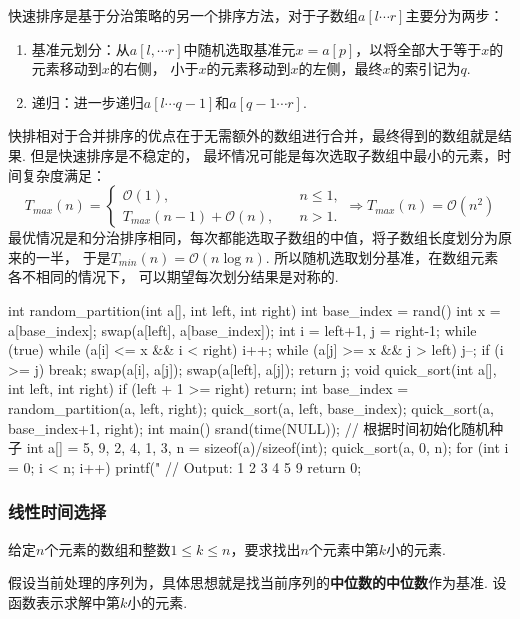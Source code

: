 \documentclass[12pt, a4paper, oneside]{ctexart}
\numberwithin{equation}{section}  %
\theoremstyle{definition}
\let\leq=\leqslant %
\def\O{\mathcal{O}}         %
\begin{document}
快速排序是基于分治策略的另一个排序方法，对于子数组$a[l\cdots r]$主要分为两步：
\begin{enumerate}
    \item 基准元划分：从$a[l,\cdots r]$中随机选取基准元$x=a[p]$，以将全部大于等于$x$的元素移动到$x$的右侧，
    小于$x$的元素移动到$x$的左侧，最终$x$的索引记为$q$.
    \item 递归：进一步递归$a[l\cdots q-1]$和$a[q-1\cdots r]$.
\end{enumerate}
快排相对于合并排序的优点在于无需额外的数组进行合并，最终得到的数组就是结果. 但是快速排序是不稳定的，
最坏情况可能是每次选取子数组中最小的元素，时间复杂度满足：
\begin{equation*}
    T_{max}(n) = \begin{cases}
        \O(1),&\quad n \leq 1,\\
        T_{max}(n-1)+\O(n),&\quad n > 1.
    \end{cases}\Rightarrow T_{max}(n) = \O(n^2)
\end{equation*}
最优情况是和分治排序相同，每次都能选取子数组的中值，将子数组长度划分为原来的一半，
于是$T_{min}(n) = \O(n\log n)$. 所以随机选取划分基准，在数组元素各不相同的情况下，
可以期望每次划分结果是对称的.
\begin{cppcode}
int random_partition(int a[], int left, int right) {
    int base_index = rand() %
    int x = a[base_index];
    swap(a[left], a[base_index]);
    int i = left+1, j = right-1;
    while (true) {
        while (a[i] <= x && i < right) i++;
        while (a[j] >= x && j > left) j--;
        if (i >= j) break;
        swap(a[i], a[j]);
    }
    swap(a[left], a[j]);
    return j;
}
void quick_sort(int a[], int left, int right) {
    if (left + 1 >= right) return;
    int base_index = random_partition(a, left, right);
    quick_sort(a, left, base_index);
    quick_sort(a, base_index+1, right);
}
int main() {
    srand(time(NULL));  // 根据时间初始化随机种子
    int a[] = {5, 9, 2, 4, 1, 3}, n = sizeof(a)/sizeof(int);
    quick_sort(a, 0, n);
    for (int i = 0; i < n; i++) printf("%
    // Output: 1 2 3 4 5 9
    return 0;
}
\end{cppcode}
\subsubsection{线性时间选择}
给定$n$个元素的数组和整数$1\leq k\leq n$，要求找出$n$个元素中第$k$小的元素.

假设当前处理的序列为，具体思想就是找当前序列的\textbf{中位数的中位数}作为基准. 
设函数表示求解中第$k$小的元素.
\end{document}
